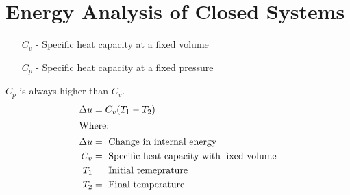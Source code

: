 \documentclass[12pt,a4paper]{article}
\begin{document}
\newpage

\section{Energy Analysis of Closed Systems}
    \begin{itemize}
        \item[$C_v$ -] Specific heat capacity at a fixed volume
        \item[$C_p$ -] Specific heat capacity at a fixed pressure 
    \end{itemize}
    $C_p$ is always higher than $C_v$. \\

    \begin{align}
        \Delta u&=C_v(T_1-T_2) \\
        \intertext{Where: }
        \Delta u&=\text{ Change in internal energy} \nonumber \\
        C_v&=\text{ Specific heat capacity with fixed volume} \nonumber \\
        T_1&=\text{ Initial temeprature} \nonumber\\
        T_2&=\text{ Final temperature} \nonumber
    \end{align} 
\newpage
\end{document}
